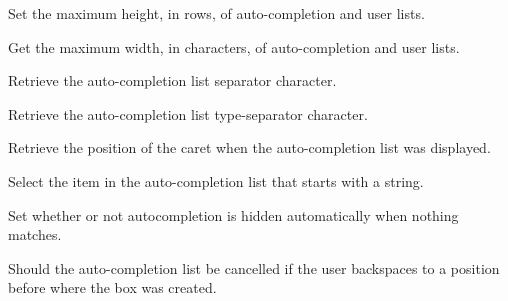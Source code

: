 
Set the maximum height, in rows, of auto-completion and user lists.


\label{wxstyledtextctrlautocompgetmaxwidth}


Get the maximum width, in characters, of auto-completion and user lists.


\label{wxstyledtextctrlautocompgetseparator}


Retrieve the auto-completion list separator character.


\label{wxstyledtextctrlautocompgettypeseparator}


Retrieve the auto-completion list type-separator character.


\label{wxstyledtextctrlautocompposstart}


Retrieve the position of the caret when the auto-completion list was displayed.


\label{wxstyledtextctrlautocompselect}


Select the item in the auto-completion list that starts with a string.


\label{wxstyledtextctrlautocompsetautohide}


Set whether or not autocompletion is hidden automatically when nothing matches.


\label{wxstyledtextctrlautocompsetcancelatstart}


Should the auto-completion list be cancelled if the user backspaces to a
position before where the box was created.


